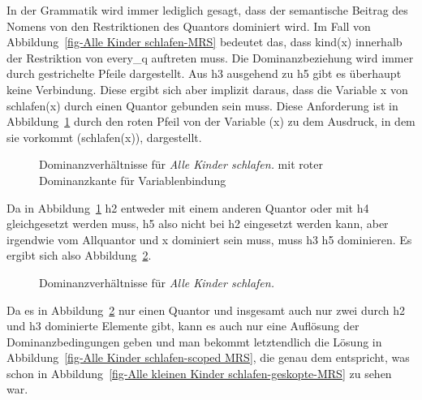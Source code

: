 In der Grammatik wird immer lediglich gesagt, dass der semantische Beitrag des Nomens von den
Restriktionen des Quantors dominiert wird. Im Fall von Abbildung~\ref{fig-Alle Kinder schlafen-MRS}
bedeutet das, dass kind(x) innerhalb der Restriktion von every\_q auftreten muss. Die
Dominanzbeziehung wird immer durch gestrichelte Pfeile dargestellt. Aus h3 ausgehend
zu h5 gibt es überhaupt keine Verbindung. Diese ergibt sich aber implizit daraus, dass die Variable
x von schlafen(x) durch einen Quantor gebunden sein muss. Diese Anforderung ist in
Abbildung~\ref{fig-Alle Kinder schlafen-MRS-Variable} durch den roten Pfeil von der
Variable (x) zu dem Ausdruck, in dem sie vorkommt (schlafen(x)), dargestellt.

\begin{figure}
\caption{Dominanzverhältnisse für \emph{Alle Kinder schlafen.} mit roter
  Dominanzkante für Variablenbindung}\label{fig-Alle Kinder schlafen-MRS-Variable}
\end{figure}
Da in Abbildung~\ref{fig-Alle Kinder schlafen-MRS-Variable} h2 entweder mit einem anderen Quantor
oder mit h4 gleichgesetzt werden muss, h5 also nicht bei h2 eingesetzt werden kann, aber irgendwie
vom Allquantor und x dominiert sein muss, muss h3 h5 dominieren. Es ergibt sich also
Abbildung~\ref{fig-Alle Kinder schlafen-MRS-Restriktion-und-Body}.
\begin{figure}
\caption{Dominanzverhältnisse für \emph{Alle Kinder schlafen.}}\label{fig-Alle Kinder schlafen-MRS-Restriktion-und-Body}
\end{figure}
Da es in Abbildung~\ref{fig-Alle Kinder schlafen-MRS-Restriktion-und-Body} nur einen Quantor und
insgesamt auch nur zwei durch h2 und h3 dominierte Elemente gibt, kann es auch nur eine Auflösung
der Dominanzbedingungen geben und man bekommt letztendlich die Lösung in Abbildung~\ref{fig-Alle Kinder
  schlafen-scoped MRS}, die genau dem entspricht, was schon in Abbildung~\ref{fig-Alle kleinen
  Kinder schlafen-geskopte-MRS} zu sehen war. 

